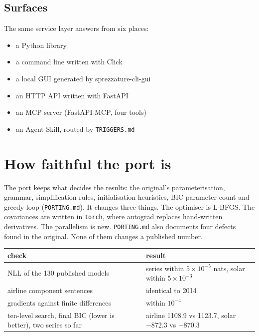 \documentclass[
]{article}
\providecommand{\tightlist}{%
  \setlength{\itemsep}{0pt}\setlength{\parskip}{0pt}}
\begin{document}
\subsection{Surfaces}\label{surfaces}

The same service layer answers from six places:

\begin{itemize}
\tightlist
\item
  a Python library
\item
  a command line written with Click
\item
  a local GUI generated by sprezzature-cli-gui
\item
  an HTTP API written with FastAPI
\item
  an MCP server (FastAPI-MCP, four tools)
\item
  an Agent Skill, routed by \texttt{TRIGGERS.md}
\end{itemize}

\section{How faithful the port is}\label{how-faithful-the-port-is}

The port keeps what decides the results: the original's
parameterisation, grammar, simplification rules, initialisation
heuristics, BIC parameter count and greedy loop (\texttt{PORTING.md}).
It changes three things. The optimiser is L-BFGS. The covariances are
written in \texttt{torch}, where autograd replaces hand-written
derivatives. The parallelism is new. \texttt{PORTING.md} also documents
four defects found in the original. None of them changes a published
number.

\begin{longtable}[]{@{}
  >{\raggedright\arraybackslash}p{}
  >{\raggedright\arraybackslash}p{}@{}}
\toprule\noalign{}
\begin{minipage}[b]{\linewidth}\raggedright
check
\end{minipage} & \begin{minipage}[b]{\linewidth}\raggedright
result
\end{minipage} \\
\midrule\noalign{}
\endhead
\bottomrule\noalign{}
\endlastfoot
NLL of the 130 published models & 12 series within \(5\times10^{-5}\)
nats, solar within \(5\times10^{-3}\) \\
airline component sentences & identical to 2014 \\
gradients against finite differences & within \(10^{-4}\) \\
ten-level search, final BIC (lower is better), two series so far &
airline 1108.9 vs 1123.7, solar −872.3 vs −870.3 \\
\end{longtable}
\end{document}

